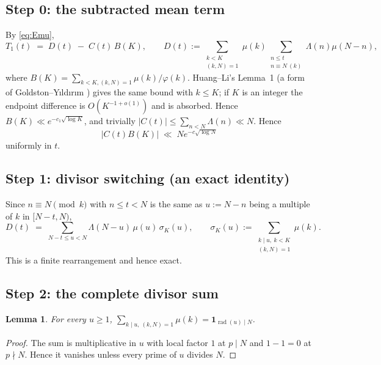 \documentclass[11pt,a4paper]{article}
\theoremstyle{plain}
\newtheorem{lemma}[theorem]{Lemma}
\theoremstyle{definition}
\theoremstyle{remark}
\DeclareMathOperator{\rad}{rad}
\begin{document}
\subsection{Step 0: the subtracted mean term}

By \eqref{eq:Emu},
\begin{equation}\label{eq:split0}
  T_1(t)\;=\;D(t)\;-\;C(t)\,B(K),
  \qquad
  D(t):=\sum_{\substack{k<K\\(k,N)=1}}\mu(k)
        \sum_{\substack{n\le t\\ n\equiv N\ (k)}}\Lambda(n)\mu(N-n),
\end{equation}
where $B(K)=\sum_{k<K,(k,N)=1}\mu(k)/\varphi(k)$. Huang--Li's Lemma~1
(a form of Goldston--Y{\i}ld{\i}r{\i}m \cite{GY}) gives the same
bound with $k\le K$; if $K$ is an integer the endpoint difference is
$O(K^{-1+o(1)})$ and is absorbed. Hence
$B(K)\ll e^{-c_1\sqrt{\log K}}$, and trivially
$|C(t)|\le\sum_{n<N}\Lambda(n)\ll N$. Hence
\begin{equation}\label{eq:meanterm}
  |C(t)B(K)|\;\ll\;Ne^{-c\sqrt{\log N}}
\end{equation}
uniformly in $t$.

\subsection{Step 1: divisor switching (an exact identity)}

Since $n\equiv N\pmod k$ with $n\le t<N$ is the same as $u:=N-n$ being
a multiple of $k$ in $[N-t,N)$,
\begin{equation}\label{eq:switch}
  D(t)\;=\;\sum_{N-t\le u<N}\Lambda(N-u)\,\mu(u)\,\sigma_K(u),
  \qquad
  \sigma_K(u):=\sum_{\substack{k\mid u,\ k<K\\ (k,N)=1}}\mu(k).
\end{equation}
This is a finite rearrangement and hence exact.

\subsection{Step 2: the complete divisor sum}

\begin{lemma}\label{lem:complete}
For every $u\ge1$,
$\displaystyle\sum_{k\mid u,\ (k,N)=1}\mu(k)=\mathbf 1_{\rad(u)\mid N}$.
\end{lemma}

\begin{proof}
The sum is multiplicative in $u$ with local factor $1$ at $p\mid N$
and $1-1=0$ at $p\nmid N$. Hence it vanishes unless every prime of $u$
divides $N$.
\end{proof}
\end{document}
